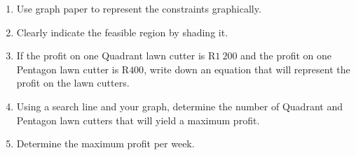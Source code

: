 \begin{wex}
{\begin{enumerate}
{%
%
ts in terms of $x$ and $y$ to represent the above mentioned
information.}
\item{Use graph paper to represent the constraints graphically.}
\item{Clearly indicate the feasible region by shading it.}
\item{If the profit on one Quadrant lawn cutter is R$1~200$ and the profit on one Pentagon
lawn cutter is R$400$, write down an equation that will represent the profit on the
lawn cutters.}
\item{Using a search line and your graph, determine the number of Quadrant and
Pentagon lawn cutters that will yield a maximum profit.}
\item{Determine the maximum profit per week.}
\end{enumerate}
}{

}
\end{wex}
